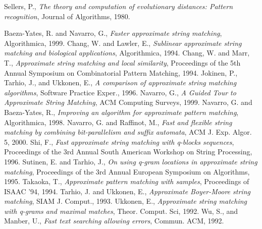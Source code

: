 \documentclass[10pt]{article}
\begin{document}
\begin{thebibliography}{999}


 Sellers, P., \textit{The theory and computation of evolutionary distances: Pattern recognition}, Journal of Algorithms, 1980.



 Baeza-Yates, R. and Navarro, G., \textit{Faster approximate string matching}, Algorithmica, 1999.
 Chang, W. and Lawler, E., \textit{Sublinear approximate string matching and biological applications}, Algorithmica, 1994.
 Chang, W. and Marr, T., \textit{Approximate string matching and local similarity}, Proceedings of the 5th Annual Symposium on Combinatorial Pattern Matching, 1994.
 Jokinen, P., Tarhio, J., and Ukkonen, E., \textit{A comparison of approximate string matching algorithms}, Software Practice Exper., 1996.
 Navarro, G., \textit{A Guided Tour to Approximate String Matching}, ACM Computing Surveys, 1999.
 Navarro, G. and Baeza-Yates, R., \textit{Improving an algorithm for approximate pattern matching}, Algorithmica, 1998.
 Navarro, G. and Raffinot, M., \textit{Fast and flexible string matching by combining bit-parallelism and suffix automata}, ACM J. Exp. Algor. 5, 2000.
 Shi, F., \textit{Fast approximate string matching with q-blocks sequences}, Proceedings of the 3rd Annual South American Workshop on String Processing, 1996.
 Sutinen, E. and Tarhio, J., \textit{On using q-gram locations in approximate string matching}, Proceedings of the 3rd Annual European Symposium on Algorithms, 1995.
 Takaoka, T., \textit{Approximate pattern matching with samples}, Proceedings of ISAAC '94, 1994.
 Tarhio, J. and Ukkonen, E., \textit{Approximate Boyer-Moore string matching}, SIAM J. Comput., 1993.
 Ukkonen, E., \textit{Approximate string matching with q-grams and maximal matches}, Theor. Comput. Sci, 1992.
 Wu, S., and Manber, U., \textit{Fast text searching allowing errors}, Commun. ACM, 1992.


\end{thebibliography}
\end{document}
